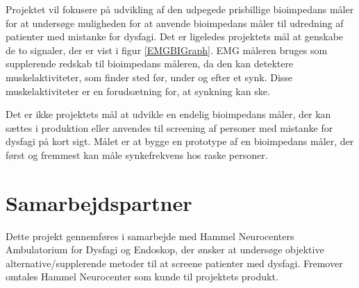Projektet vil fokusere på udvikling af den udpegede prisbillige bioimpedans måler for at undersøge muligheden for at anvende bioimpedans måler til udredning af patienter med mistanke for dysfagi. Det er ligeledes projektets mål at genskabe de to signaler, der er vist i figur \ref{EMGBIGraph}. EMG måleren bruges som supplerende redskab til bioimpedans måleren, da den kan detektere muskelaktiviteter, som finder sted før, under og efter et synk. Disse muskelaktiviteter er en forudsætning for, at synkning kan ske. 

Det er ikke projektets mål at udvikle en endelig bioimpedans måler, der kan sættes i produktion eller anvendes til screening af personer med mistanke for dysfagi på kort sigt. Målet er at bygge en prototype af en bioimpedans måler, der først og fremmest kan måle synkefrekvens hos raske personer. 

\section{Samarbejdspartner}
Dette projekt gennemføres i samarbejde med Hammel Neurocenters Ambulatorium for Dysfagi og Endoskop, der ønsker at undersøge objektive alternative/supplerende metoder til at screene patienter med dysfagi. Fremover omtales Hammel Neurocenter som kunde til projektets produkt. 

